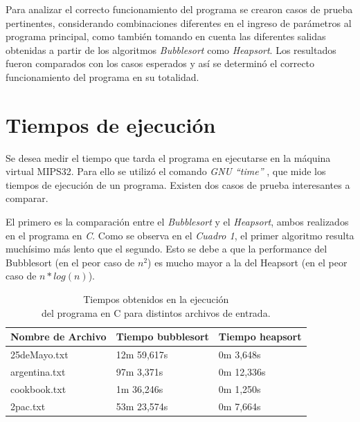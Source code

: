 \documentclass{article}
\begin{document}
	Para analizar el correcto funcionamiento del programa se crearon casos de prueba pertinentes, considerando combinaciones diferentes en el ingreso de parámetros al programa principal, como también tomando en cuenta las diferentes salidas obtenidas a partir de los algoritmos \textit{Bubblesort} como \textit{Heapsort}. Los resultados fueron comparados con los casos esperados y así se determinó el correcto funcionamiento del programa en su totalidad.
\bigskip



\section{Tiempos de ejecución}

	\par
	Se desea medir el tiempo que tarda el programa en ejecutarse en la máquina virtual MIPS32. Para ello se utilizó el comando \textit{GNU ``time''} \cite{TIME}, que mide los tiempos de ejecución de un programa. Existen dos casos de prueba interesantes a comparar. 
	\par
	El primero es la comparación entre el \textit{Bubblesort} y el \textit{Heapsort}, ambos realizados en el programa en \textit{C}. Como se observa en el \textit{Cuadro 1}, el primer algoritmo resulta muchísimo más lento que el segundo. Esto se debe a que la performance del Bubblesort (en el peor caso de \(n^2\)) es mucho mayor a la del Heapsort (en el peor caso de \(n*log(n)\)).
	\medskip
	\newpage

	\begin{table}[!hbt]
		\begin{center}
		\begin{tabular}{|>{\centering\arraybackslash}m{3cm}|>{\centering \arraybackslash}m{3cm}|>{\centering \arraybackslash}m{3cm}|}
			\hline
			\rowcolor[gray]{0.9}\textbf{Nombre de Archivo} & \textbf{Tiempo bubblesort} & \textbf{Tiempo heapsort}\\
			\hline
			\centering 25deMayo.txt & 12m 59,617s & 0m 3,648s \\
			\hline
			\centering argentina.txt & 97m 3,371s & 0m 12,336s \\
			\hline
			\centering cookbook.txt & 1m 36,246s & 0m 1,250s \\
			\hline
			\centering 2pac.txt & 53m 23,574s & 0m 7,664s \\
			\hline
		\end{tabular}
		\smallskip
		\caption{Tiempos obtenidos en la ejecución\\ del programa en C para distintos archivos de entrada.}
		\end{center}
	\end{table}
	\bigskip
	
\end{document}
